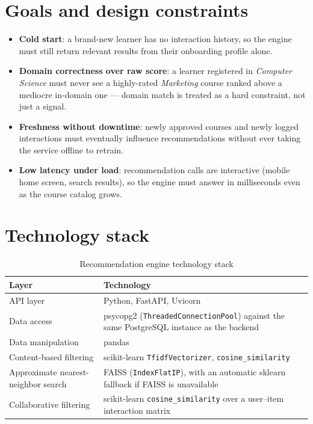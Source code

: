 \documentclass[a4paper,12pt]{report}
\begin{document}
\section{Goals and design constraints}
\begin{itemize}[leftmargin=*]
  \item \textbf{Cold start}: a brand-new learner has no interaction
        history, so the engine must still return relevant results from
        their onboarding profile alone.
  \item \textbf{Domain correctness over raw score}: a learner registered
        in \emph{Computer Science} must never see a highly-rated
        \emph{Marketing} course ranked above a mediocre in-domain one —
        domain match is treated as a hard constraint, not just a signal.
  \item \textbf{Freshness without downtime}: newly approved courses and
        newly logged interactions must eventually influence
        recommendations without ever taking the service offline to
        retrain.
  \item \textbf{Low latency under load}: recommendation calls are
        interactive (mobile home screen, search results), so the engine
        must answer in milliseconds even as the course catalog grows.
\end{itemize}

\section{Technology stack}
\begin{table}[H]
\centering
\caption{Recommendation engine technology stack}
\begin{tabular}{|P{3.5cm}|P{9cm}|}
\hline
{}
\textbf{Layer} & \textbf{Technology} \\
\hline
API layer & Python, FastAPI, Uvicorn \\
\hline
Data access & psycopg2 (\texttt{ThreadedConnectionPool}) against the same PostgreSQL instance as the backend \\
\hline
Data manipulation & pandas \\
\hline
Content-based filtering & scikit-learn \texttt{TfidfVectorizer}, \texttt{cosine\_similarity} \\
\hline
Approximate nearest-neighbor search & FAISS (\texttt{IndexFlatIP}), with an automatic sklearn fallback if FAISS is unavailable \\
\hline
Collaborative filtering & scikit-learn \texttt{cosine\_similarity} over a user--item interaction matrix \\
\hline
\end{tabular}
\end{table}
\end{document}
